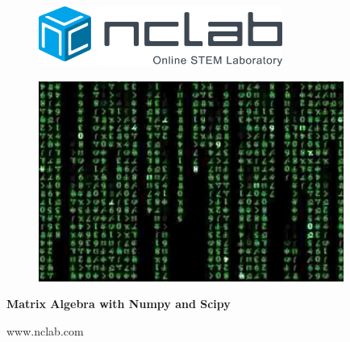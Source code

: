 \documentclass{article}
\begin{document}
\large

\vbox{}
\begin{figure}[!ht]
\includegraphics[width=8cm]{img/logo.png}
\vspace{29mm}
\end{figure}

\begin{figure}[!ht]
\begin{center}
\includegraphics[width=10cm]{img/frontpage.png}
\vspace{29mm}
\end{center}
\end{figure}

\centerline{\Huge \bf Matrix Algebra with Numpy and Scipy}

\vfill

\centerline{\Large www.nclab.com}

\newpage




\section*{}


\end{document}
